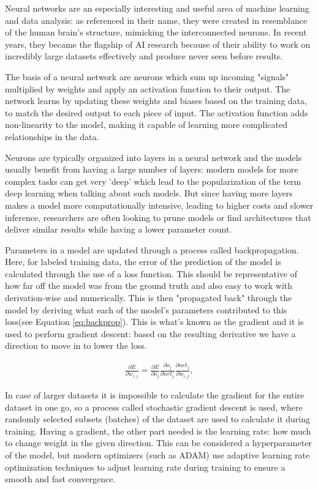 	Neural networks are an especially interesting and useful area of machine learning and data analysis: as referenced in their name, they were created in resemblance of the human brain's structure, mimicking the interconnected neurons. In recent years, they became the flagship of AI research because of their ability to work on incredibly large datasets effectively and produce never seen before results. 
	
	The basis of a neural network are neurons which sum up incoming "signals" multiplied by weights and apply an activation function to their output. The network learns by updating these weights and biases based on the training data, to match the desired output to each piece of input\cite{HECHTNIELSEN199265}. The activation function adds non-linearity to the model, making it capable of learning more complicated relationships in the data.
	
	Neurons are typically organized into layers in a neural network and the models usually benefit from having a large number of layers: modern models for more complex tasks can get very 'deep' which lead to the popularization of the term deep learning when talking about such models. But since having more layers makes a model more computationally intensive, leading to higher costs and slower inference, researchers are often looking to prune models or find architectures that deliver similar results while having a lower parameter count\cite{liang2021pruning}.
	
	Parameters in a model are updated through a process called backpropagation\cite{rumelhart1986learning}. Here, for labeled training data, the error of the prediction of the model is calculated through the use of a loss function. This should be representative of how far off the model was from the ground truth and also easy to work with derivation-wise and numerically. This is then "propagated back" through the model by deriving what each of the model's parameters contributed to this loss(see Equation \ref{eq:backprop}). This is what's known as the gradient and it is used to perform gradient descent: based on the resulting derivative we have a direction to move in to lower the loss.
	
	\begin{align}
		\label{eq:backprop}
		\frac{\partial{E}}{\partial{w_{i,j}}} = \frac{\partial{E}}{\partial{o_j}}\frac{\partial{o_j}}{\partial{net_j}}\frac{\partial{net_j}}{\partial{w_{i,j}}},
	\end{align}
	
	
	In case of larger datasets it is impossible to calculate the gradient for the entire dataset in one go, so a process called stochastic gradient descent\cite{amari1993backpropagation} is used, where randomly selected subsets (batches) of the dataset are used to calculate it during training. Having a gradient, the other part needed is the learning rate: how much to change weight in the given direction. This can be considered a hyperparameter of the model, but modern optimizers (such as ADAM\cite{kingma2014adam}) use adaptive learning rate optimization techniques to adjust learning rate during training to ensure a smooth and fast convergence.
	
